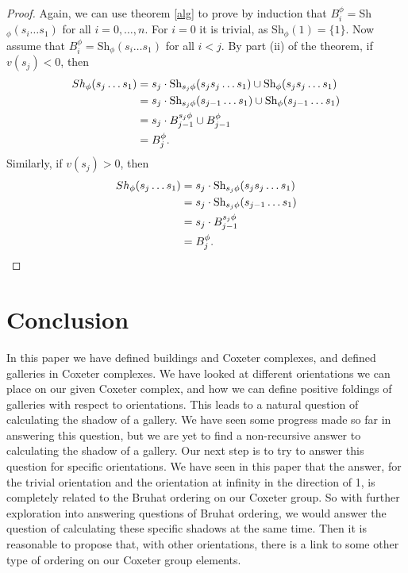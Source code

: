 \documentclass[11pt]{article}
\begin{document}
\begin{proof}
    Again, we can use theorem \ref{alg} to prove by induction that $B^\phi_i=$Sh$_\phi(s_i\hdots s_1)$ for all $i=0,\hdots ,n$. For $i=0$ it is trivial, as Sh$_\phi(1)=\{1\}$. Now assume that $B^\phi_i=$Sh$_\phi(s_i\hdots s_1)$ for all $i<j$. By part (ii) of the theorem, if $v(s_j)<0$, then
    \[\begin{aligned}
        Sh_\phi(s_j\hdots s_1)&=s_j\cdot \textnormal{Sh}_{s_j\phi}(s_js_j\hdots s_1)\cup \textnormal{Sh}_\phi(s_js_j\hdots s_1)\\
                        &=  s_j\cdot \textnormal{Sh}_{s_j\phi}(s_{j-1}\hdots s_1)\cup \textnormal{Sh}_\phi(s_{j-1}\hdots s_1)\\
                        &= s_j\cdot B^{s_j\phi}_{j-1}\cup B^{\phi}_{j-1}\\
                        &= B^\phi_j. 
    \end{aligned}\]
    Similarly, if $v(s_j)>0$, then
    \[\begin{aligned}
        Sh_\phi(s_j\hdots s_1)& = s_j\cdot \textnormal{Sh}_{s_j\phi}(s_js_j\hdots s_1)\\
                        & = s_j\cdot \textnormal{Sh}_{s_j\phi}(s_{j-1}\hdots s_1)\\
                        & = s_j \cdot B^{s_j\phi}_{j-1}\\
                        & = B^{\phi}_{j}. 
    \end{aligned}\]
\end{proof}


\section{Conclusion}

In this paper we have defined buildings and Coxeter complexes, and defined galleries in Coxeter complexes. We have looked at different orientations we can place on our given Coxeter complex, and how we can define positive foldings of galleries with respect to orientations. This leads to a natural question of calculating the shadow of a gallery. We have seen some progress made so far in answering this question, but we are yet to find a non-recursive answer to calculating the shadow of a gallery. Our next step is to try to answer this question for specific orientations. We have seen in this paper that the answer, for the trivial orientation and the orientation at infinity in the direction of 1, is completely related to the Bruhat ordering on our Coxeter group. So with further exploration into answering questions of Bruhat ordering, we would answer the question of calculating these specific shadows at the same time. Then it is reasonable to propose that, with other orientations, there is a link to some other type of ordering on our Coxeter group elements. 



\end{document}
